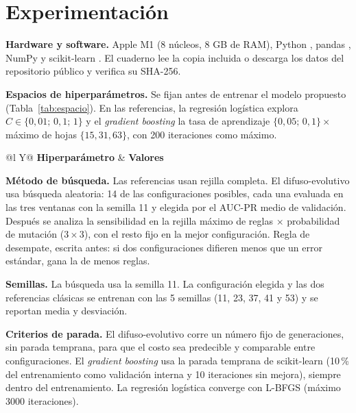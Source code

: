 \section{Experimentación}
\label{sec:experimentacion}

\textbf{Hardware y software.} Apple M1 (8 núcleos, 8 GB de RAM), Python \cifEtresPython{}, pandas \cifEtresPandas{}, NumPy \cifEtresNumpy{} y scikit-learn \cifEtresSklearn{}. El cuaderno lee la copia incluida o descarga los datos del repositorio público \cite{DatosKernel2026} y verifica su SHA-256.

\textbf{Espacios de hiperparámetros.} Se fijan antes de entrenar el modelo propuesto (Tabla~\ref{tab:espacio}). En las referencias, la regresión logística explora $C\in\{0{,}01;\,0{,}1;\,1\}$ y el \emph{gradient boosting} la tasa de aprendizaje $\{0{,}05;\,0{,}1\}\times$ máximo de hojas $\{15, 31, 63\}$, con 200 iteraciones como máximo.

\begin{table}[!t]
\caption{Espacio de hiperparámetros del difuso-evolutivo (arriba, buscados; abajo, fijos)}
\label{tab:espacio}
\centering\footnotesize
\begin{tabularx}{\columnwidth}{@{}l Y@{}}
\toprule
\cabecera \textbf{Hiperparámetro} & \textbf{Valores}\\
\midrule
{}
\bottomrule
\end{tabularx}
\end{table}

\textbf{Método de búsqueda.} Las referencias usan rejilla completa. El difuso-evolutivo usa búsqueda aleatoria: 14 de las \cifEtresNConfigs{} configuraciones posibles, cada una evaluada en las tres ventanas con la semilla 11 y elegida por el AUC-PR medio de validación. Después se analiza la sensibilidad en la rejilla máximo de reglas $\times$ probabilidad de mutación ($3\times3$), con el resto fijo en la mejor configuración. Regla de desempate, escrita antes: si dos configuraciones difieren menos que un error estándar, gana la de menos reglas.

\textbf{Semillas.} La búsqueda usa la semilla 11. La configuración elegida y las dos referencias clásicas se entrenan con las 5 semillas (11, 23, 37, 41 y 53) y se reportan media y desviación.

\textbf{Criterios de parada.} El difuso-evolutivo corre un número fijo de generaciones, sin parada temprana, para que el costo sea predecible y comparable entre configuraciones. El \emph{gradient boosting} usa la parada temprana de scikit-learn (10\,\% del entrenamiento como validación interna y 10 iteraciones sin mejora), siempre dentro del entrenamiento. La regresión logística converge con L-BFGS (máximo 3000 iteraciones).

